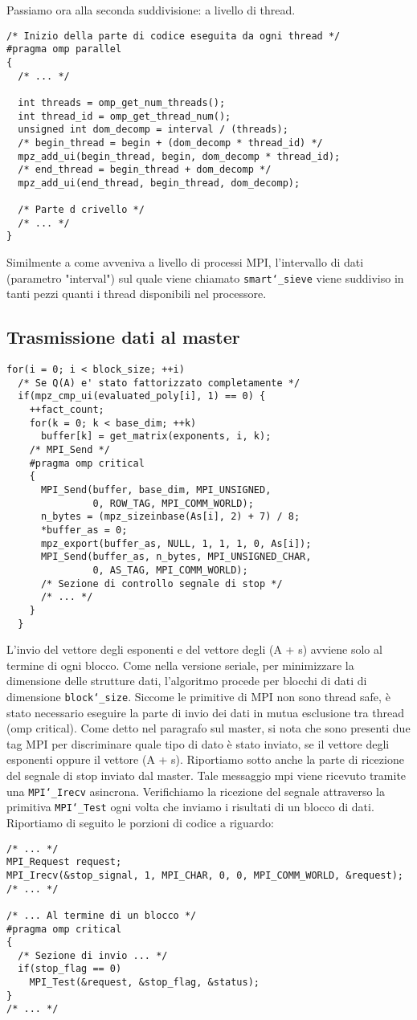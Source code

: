Passiamo ora alla seconda suddivisione: a livello di thread.
\begin{lstlisting}
/* Inizio della parte di codice eseguita da ogni thread */
#pragma omp parallel
{ 
  /* ... */
 
  int threads = omp_get_num_threads();
  int thread_id = omp_get_thread_num();
  unsigned int dom_decomp = interval / (threads);
  /* begin_thread = begin + (dom_decomp * thread_id) */
  mpz_add_ui(begin_thread, begin, dom_decomp * thread_id); 
  /* end_thread = begin_thread + dom_decomp */
  mpz_add_ui(end_thread, begin_thread, dom_decomp); 

  /* Parte d crivello */
  /* ... */
}
\end{lstlisting}
Similmente a come avveniva a livello di processi MPI, l'intervallo di
dati (parametro "interval") sul quale viene chiamato
\texttt{smart\char`_sieve} viene suddiviso in tanti pezzi quanti i thread
disponibili nel processore.
\subsection{Trasmissione dati al master}
\begin{lstlisting}
for(i = 0; i < block_size; ++i)
  /* Se Q(A) e' stato fattorizzato completamente */
  if(mpz_cmp_ui(evaluated_poly[i], 1) == 0) {
    ++fact_count;
    for(k = 0; k < base_dim; ++k)
      buffer[k] = get_matrix(exponents, i, k);
    /* MPI_Send */
    #pragma omp critical 
    {
      MPI_Send(buffer, base_dim, MPI_UNSIGNED, 
               0, ROW_TAG, MPI_COMM_WORLD);
      n_bytes = (mpz_sizeinbase(As[i], 2) + 7) / 8;
      *buffer_as = 0;
      mpz_export(buffer_as, NULL, 1, 1, 1, 0, As[i]);
      MPI_Send(buffer_as, n_bytes, MPI_UNSIGNED_CHAR, 
               0, AS_TAG, MPI_COMM_WORLD);
      /* Sezione di controllo segnale di stop */
      /* ... */
    }
  }
\end{lstlisting}
L'invio del vettore degli esponenti e del vettore degli (A + s)
avviene solo al termine di ogni blocco. Come nella versione seriale, 
per minimizzare la dimensione delle strutture dati, l'algoritmo
procede per blocchi di dati di dimensione \texttt{block\char`_size}. Siccome
le primitive di MPI non sono thread safe, è stato necessario eseguire
la parte di invio dei dati in mutua esclusione tra
thread (omp critical). Come detto nel paragrafo sul master, si nota
che sono presenti due tag MPI per discriminare quale
tipo di dato è stato inviato, se il vettore degli esponenti oppure il
vettore (A + s). Riportiamo sotto anche la parte di ricezione del
segnale di stop inviato dal master. Tale messaggio mpi viene ricevuto
tramite una \texttt{MPI\char`_Irecv} asincrona. Verifichiamo la
ricezione del segnale attraverso la primitiva \texttt{MPI\char`_Test}
ogni volta che inviamo i risultati di un blocco di dati. Riportiamo di
seguito le porzioni di codice a riguardo:
\begin{lstlisting}
/* ... */
MPI_Request request;
MPI_Irecv(&stop_signal, 1, MPI_CHAR, 0, 0, MPI_COMM_WORLD, &request);
/* ... */

/* ... Al termine di un blocco */
#pragma omp critical 
{
  /* Sezione di invio ... */
  if(stop_flag == 0)
    MPI_Test(&request, &stop_flag, &status); 
}
/* ... */
\end{lstlisting}
